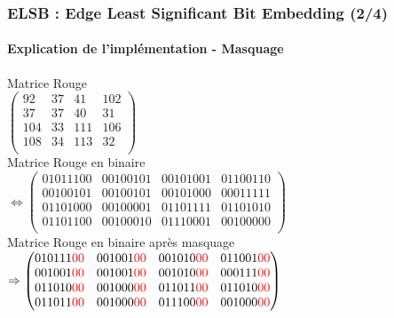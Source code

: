 \documentclass{beamer}
\begin{document}
\begin{frame}
\frametitle{ELSB : Edge Least Significant Bit Embedding (2/4)}
\framesubtitle{Explication de l'implémentation \-- \textbf{Masquage}}

\centering
Matrice Rouge \\
$ \begin{pmatrix}
92 & 37 & 41 & 102 \\
37 & 37 & 40 & 31 \\
104 & 33 & 111 & 106 \\
108 & 34 & 113 & 32 \\
\end{pmatrix} $ \\
\vspace{0.2cm}
\hspace{0.2cm} Matrice Rouge en binaire \\
$ \Leftrightarrow \begin{pmatrix}
01011100 & 00100101 & 00101001 & 01100110 \\
00100101 & 00100101 & 00101000 & 00011111 \\
01101000 & 00100001 & 01101111 & 01101010 \\
01101100 & 00100010 & 01110001 & 00100000 \\
\end{pmatrix} $ \\
\vspace{0.2cm}
\hspace{0.3cm} Matrice Rouge en binaire après masquage \\
$ \Rightarrow \begin{pmatrix}
010111 \textcolor{red}{00} & 001001 \textcolor{red}{00} & 001010 \textcolor{red}{00} & 011001 \textcolor{red}{00} \\
001001 \textcolor{red}{00} & 001001 \textcolor{red}{00} & 001010 \textcolor{red}{00} & 000111 \textcolor{red}{00} \\
011010 \textcolor{red}{00} & 001000 \textcolor{red}{00} & 011011 \textcolor{red}{00} & 011010\textcolor{red}{00} \\
011011 \textcolor{red}{00} & 001000 \textcolor{red}{00} & 011100 \textcolor{red}{00} & 001000 \textcolor{red}{00} \\
\end{pmatrix} $
\end{frame}
\end{document}
